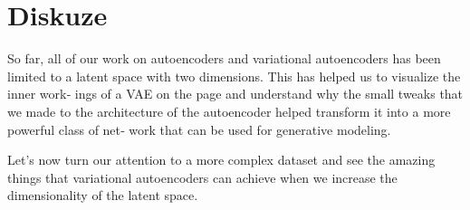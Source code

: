 \section{Diskuze}
\label{sec:vae_model_discussion}

So far, all of our work on autoencoders and variational autoencoders has been limited
to a latent space with two dimensions. This has helped us to visualize the inner work‐
ings of a VAE on the page and understand why the small tweaks that we made to the
architecture of the autoencoder helped transform it into a more powerful class of net‐
work that can be used for generative modeling.

Let’s now turn our attention to a more complex dataset and see the amazing things
that variational autoencoders can achieve when we increase the dimensionality of the
latent space.